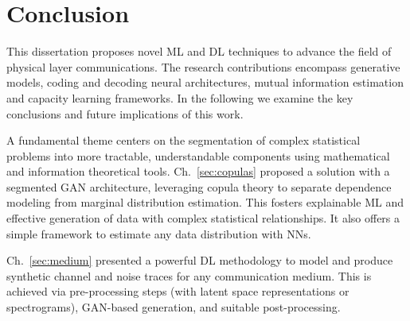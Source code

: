 \chapter{Conclusion}
\label{sec:conclusion}
This dissertation proposes novel ML and DL techniques to advance the field of physical layer communications. The research contributions encompass generative models, coding and decoding neural architectures, mutual information estimation and capacity learning frameworks.
In the following we examine the key conclusions and future implications of this work.

A fundamental theme centers on the segmentation of complex statistical problems into more tractable, understandable components using mathematical and information theoretical tools.
Ch.~\ref{sec:copulas} proposed a solution with a segmented GAN architecture, leveraging copula theory to separate dependence modeling from marginal distribution estimation. This fosters explainable ML and effective generation of data with complex statistical relationships. It also offers a simple framework to estimate any data distribution with NNs.

Ch.~\ref{sec:medium} presented a powerful DL methodology to model and produce synthetic channel and noise traces for any communication medium. This is achieved via pre-processing steps (with latent space representations or spectrograms), GAN-based generation, and suitable post-processing.

